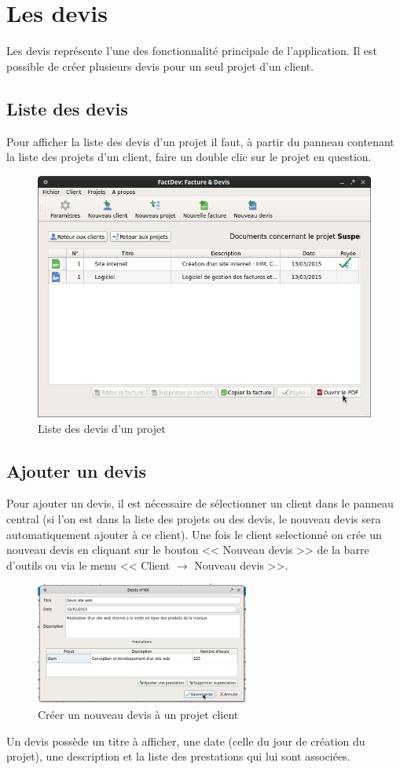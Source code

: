 \chapter{Les devis}
Les devis représente l'une des fonctionnalité principale de l'application. Il est possible de créer plusieurs devis pour un seul projet d'un client. 
\section{Liste des devis}
Pour afficher la liste des devis d'un projet il faut, à partir du panneau contenant la liste des projets d'un client, faire un double clic sur le projet en question.
\begin{figure}[H]
	\centering
	\includegraphics[width=12cm]{screens/ihmDevis.png}
	\caption{Liste des devis d'un projet}
\end{figure}

\section{Ajouter un devis}
Pour ajouter un devis, il est nécessaire de sélectionner un client dans le panneau central (si l'on est dans la liste des projets ou des devis, le nouveau devis sera automatiquement ajouter à ce client). Une fois le client selectionné on crée un nouveau devis en cliquant sur le bouton << Nouveau devis >> de la barre d'outils ou via le menu << Client $\rightarrow$ Nouveau devis >>. 
\begin{figure}[H]
	\centering
	\includegraphics[width=7cm]{screens/creerDevis.png}
	\caption{Créer un nouveau devis à un projet client}
\end{figure}
Un devis possède un titre à afficher, une date (celle du jour de création du projet), une description et la liste des prestations qui lui sont associées. 
